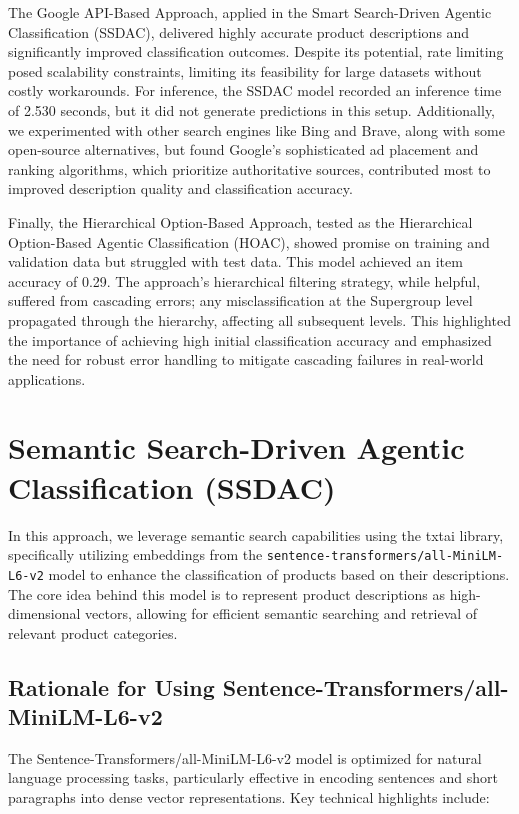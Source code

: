 \documentclass[9pt,a4paper,twoside]{rho-class/rho}
\begin{document}
The Google API-Based Approach, applied in the Smart Search-Driven Agentic Classification (SSDAC), delivered highly accurate product descriptions and significantly improved classification outcomes. Despite its potential, rate limiting posed scalability constraints, limiting its feasibility for large datasets without costly workarounds. For inference, the SSDAC model recorded an inference time of 2.530 seconds, but it did not generate predictions in this setup. Additionally, we experimented with other search engines like Bing and Brave, along with some open-source alternatives, but found Google’s sophisticated ad placement and ranking algorithms, which prioritize authoritative sources, contributed most to improved description quality and classification accuracy.

Finally, the Hierarchical Option-Based Approach, tested as the Hierarchical Option-Based Agentic Classification (HOAC), showed promise on training and validation data but struggled with test data. This model achieved an item accuracy of 0.29. The approach’s hierarchical filtering strategy, while helpful, suffered from cascading errors; any misclassification at the Supergroup level propagated through the hierarchy, affecting all subsequent levels. This highlighted the importance of achieving high initial classification accuracy and emphasized the need for robust error handling to mitigate cascading failures in real-world applications.

\section{Semantic Search-Driven Agentic Classification (SSDAC)}
    In this approach, we leverage semantic search capabilities using the txtai library, specifically utilizing embeddings from the \texttt{sentence-transformers/all-MiniLM-L6-v2} model to enhance the classification of products based on their descriptions. The core idea behind this model is to represent product descriptions as high-dimensional vectors, allowing for efficient semantic searching and retrieval of relevant product categories.

    \subsection{Rationale for Using Sentence-Transformers/all-MiniLM-L6-v2}
    The Sentence-Transformers/all-MiniLM-L6-v2 model is optimized for natural language processing tasks, particularly effective in encoding sentences and short paragraphs into dense vector representations. Key technical highlights include:
    
\end{document}
